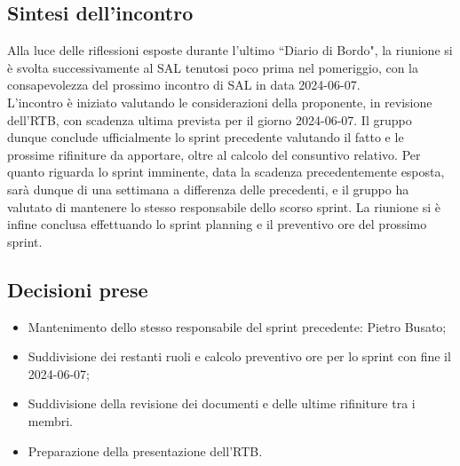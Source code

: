 \documentclass[8pt]{article}
\begin{document}
\subsection{Sintesi dell'incontro}
Alla luce delle riflessioni esposte durante l'ultimo ``Diario di Bordo", la riunione si è svolta
successivamente al SAL tenutosi poco prima nel pomeriggio, con la consapevolezza del prossimo incontro di SAL in data 2024-06-07.
\\
L'incontro è iniziato valutando le considerazioni della proponente, in revisione dell'RTB,
con scadenza ultima prevista per il giorno 2024-06-07. Il gruppo dunque conclude ufficialmente lo sprint precedente valutando il fatto e le prossime rifiniture da apportare,
oltre al calcolo del consuntivo relativo.
Per quanto riguarda lo sprint imminente, data la scadenza precedentemente esposta, sarà dunque di una settimana a differenza delle precedenti, e il gruppo ha valutato di mantenere lo stesso responsabile dello scorso sprint.
La riunione si è infine conclusa effettuando lo sprint planning e il preventivo ore del prossimo sprint.

\subsection{Decisioni prese}
\begin{itemize}
	\setlength\itemsep{0em}
	\item Mantenimento dello stesso responsabile del sprint precedente: Pietro Busato;
	\item Suddivisione dei restanti ruoli e calcolo preventivo ore per lo sprint con fine il
      2024-06-07;
	\item Suddivisione della revisione dei documenti e delle ultime rifiniture tra i membri.
	\item Preparazione della presentazione dell'RTB.
\end{itemize}
\newpage
\end{document}
